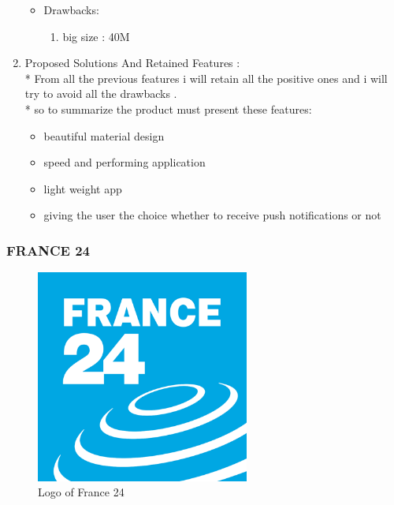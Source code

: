 \begin{enumerate}
\begin{itemize}
\begin{enumerate}
 
 

	

\end{enumerate}  
  
  
 \item Drawbacks: 
 \begin{enumerate}
 \item big size : 40M
  \end{enumerate}  
\end{itemize}  
\item Proposed Solutions And Retained Features :
\\* 
From all the previous features i will retain all the positive ones and i will try to avoid all the drawbacks .  
\\*
so to summarize the product must present these features:  
\begin{itemize}
\item beautiful material  design  
\item speed and performing application 
\item light weight app 
\item giving the user the choice whether to receive push notifications or not
\end{itemize}


\end{enumerate}
 \newpage
 \subsubsection{FRANCE 24}
\begin{figure}[h!]
	\includegraphics[width=7cm]{france24.png}
	\caption{Logo of France 24  }
	\label{france24}
\end{figure}
	
